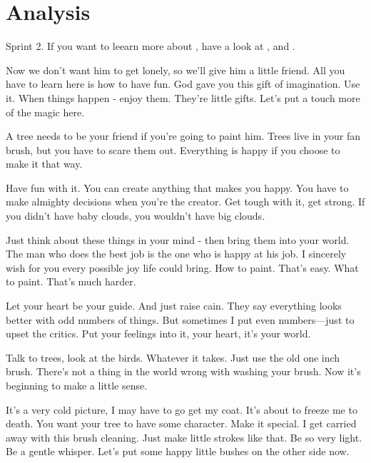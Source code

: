 \section{Analysis}
Sprint 2. If you want to leearn  more about \LaTeXe{}, have a look at \cite{Madsen2010}, \cite{Oetiker2010} and \cite{Mittelbach2005}.

Now we don't want him to get lonely, so we'll give him a little friend. All you have to learn here is how to have fun. God gave you this gift of imagination. Use it. When things happen - enjoy them. They're little gifts. Let's put a touch more of the magic here.

A tree needs to be your friend if you're going to paint him. Trees live in your fan brush, but you have to scare them out. Everything is happy if you choose to make it that way.

Have fun with it. You can create anything that makes you happy. You have to make almighty decisions when you're the creator. Get tough with it, get strong. If you didn't have baby clouds, you wouldn't have big clouds.

Just think about these things in your mind - then bring them into your world. The man who does the best job is the one who is happy at his job. I sincerely wish for you every possible joy life could bring. How to paint. That's easy. What to paint. That's much harder.

Let your heart be your guide. And just raise cain. They say everything looks better with odd numbers of things. But sometimes I put even numbers—just to upset the critics. Put your feelings into it, your heart, it's your world.

Talk to trees, look at the birds. Whatever it takes. Just use the old one inch brush. There's not a thing in the world wrong with washing your brush. Now it's beginning to make a little sense.

It's a very cold picture, I may have to go get my coat. It’s about to freeze me to death. You want your tree to have some character. Make it special. I get carried away with this brush cleaning. Just make little strokes like that. Be so very light. Be a gentle whisper. Let's put some happy little bushes on the other side now.

